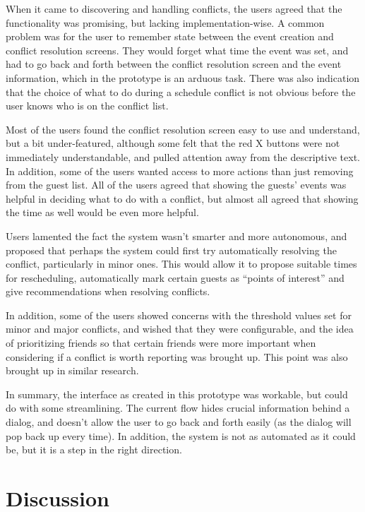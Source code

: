 \documentclass[a4paper,11pt]{report}
\begin{document}
When it came to discovering and handling conflicts, the users agreed that the
functionality was promising, but lacking implementation-wise. A common problem
was for the user to remember state between the event creation and conflict
resolution screens. They would forget what time the event was set, and had to go
back and forth between the conflict resolution screen and the event information,
which in the prototype is an arduous task. There was also indication that the
choice of what to do during a schedule conflict is not obvious before the user
knows who is on the conflict list.

Most of the users found the conflict resolution screen easy to use and
understand, but a bit under-featured, although some felt that the red X buttons
were not immediately understandable, and pulled attention away from the
descriptive text. In addition, some of the users wanted access to more actions
than just removing from the guest list. All of the users agreed that showing the
guests' events was helpful in deciding what to do with a conflict, but almost
all agreed that showing the time as well would be even more helpful.

Users lamented the fact the system wasn't smarter and more autonomous, and
proposed that perhaps the system could first try automatically resolving the
conflict, particularly in minor ones. This would allow it to propose suitable
times for rescheduling, automatically mark certain guests as ``points of
interest'' and give recommendations when resolving conflicts.

In addition, some of the users showed concerns with the threshold values set for
minor and major conflicts, and wished that they were configurable, and the idea
of prioritizing friends so that certain friends were more important when
considering if a conflict is worth reporting was brought up. This point was also
brought up in similar research\cite{benhassine07,haynes97:_autom_meetin_sched_system}.

In summary, the interface as created in this prototype was workable, but could
do with some streamlining. The current flow hides crucial information behind a
dialog, and doesn't allow the user to go back and forth easily (as the dialog
will pop back up every time). In addition, the system is not as automated as it
could be, but it is a step in the right direction.

\chapter{Discussion}
\end{document}
